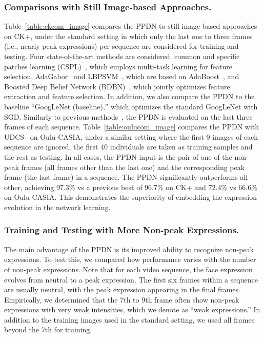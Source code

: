 \documentclass[runningheads]{llncs}
\begin{document}
\subsubsection{Comparisons with Still Image-based Approaches.}  
Table~\ref{table:ckcom_image} compares the PPDN to still image-based 
approaches on CK+, under the standard setting in which only the last
one to three frames (i.e., nearly peak expressions) per sequence are considered 
for training and testing. Four state-of-the-art methods are considered: 
common and specific patches learning (CSPL)~\cite{zhong2012learning},
which employs multi-task learning for feature selection,
AdaGabor~\cite{bartlett2005recognizing} and LBPSVM~\cite{shan2009facial},
which are based on AdaBoost~\cite{AdaBoost}, and Boosted Deep Belief 
Network (BDBN)~\cite{liu2014facial}, which jointly optimizes feature 
extraction and feature selection. In addition, we also compare the PPDN 
to the  baseline ``GoogLeNet (baseline),'' which optimizes the standard 
GoogLeNet with SGD. Similarly to previous 
methods~\cite{zhong2012learning,shan2009facial,liu2014facial},
 the PPDN is evaluated on the last three frames of each sequence. 
Table~\ref{table:oulucom_image} compares the PPDN with UDCS~\cite{UDCS} on 
Oulu-CASIA, under a similar setting where the first 9 images of each 
sequence are ignored, the first 40 individuals are taken as training samples 
and the rest as testing. In all cases, the PPDN input is the pair of one of 
the non-peak frames (all frames other than the last one) and the 
corresponding peak frame (the last frame) in a sequence. 
The PPDN significantly outperforms all other, 
achieving 97.3\% vs a previous best of 96.7\% on 
CK+ and 72.4\% vs 66.6\% on Oulu-CASIA.  This demonstrates the 
superiority of embedding the expression evolution in the network learning.

\subsubsection{Training and Testing with More Non-peak Expressions.} 
The main advantage of the PPDN is its improved ability to
recognize non-peak expressions. To test this,
we compared how performance varies with the number of non-peak expressions. 
Note that for each video sequence, the face expression evolves from neutral 
to a peak expression. The first six frames within a sequence are usually
neutral, with the peak expression appearing in the final frames. 
Empirically, we determined that the 7th to 9th frame often show 
non-peak expressions with very weak intensities, which we
denote as ``weak expressions.'' In addition to the training images used
in the standard setting,  we used all frames beyond the 7th for training. 
\end{document}
